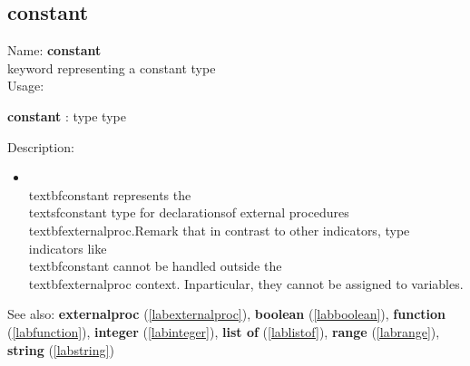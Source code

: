 \subsection{constant}
\label{labconstant}
\noindent Name: \textbf{constant}\\
keyword representing a \textsf{constant} type \\
\noindent Usage: 
\begin{center}
\textbf{constant} : \textsf{type type}\\
\end{center}
\noindent Description: \begin{itemize}

\item \\textbf{constant} represents the \\textsf{constant} type for declarations\n   of external procedures \\textbf{externalproc}.\n    \n   Remark that in contrast to other indicators, type indicators like\n   \\textbf{constant} cannot be handled outside the \\textbf{externalproc} context.  In\n   particular, they cannot be assigned to variables.\n\end{itemize}
See also: \textbf{externalproc} (\ref{labexternalproc}), \textbf{boolean} (\ref{labboolean}), \textbf{function} (\ref{labfunction}), \textbf{integer} (\ref{labinteger}), \textbf{list of} (\ref{lablistof}), \textbf{range} (\ref{labrange}), \textbf{string} (\ref{labstring})
